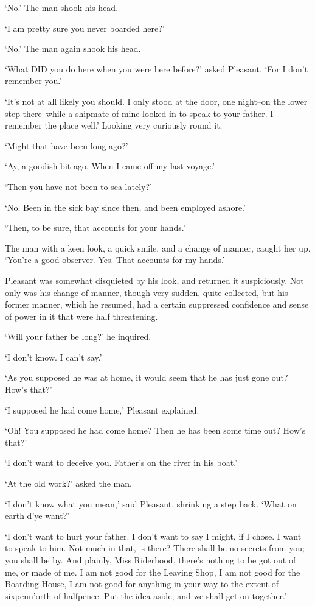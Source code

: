 ‘No.’ The man shook his head.

‘I am pretty sure you never boarded here?’

‘No.’ The man again shook his head.

‘What DID you do here when you were here before?’ asked Pleasant. ‘For I
don’t remember you.’

‘It’s not at all likely you should. I only stood at the door, one
night--on the lower step there--while a shipmate of mine looked in to
speak to your father. I remember the place well.’ Looking very curiously
round it.

‘Might that have been long ago?’

‘Ay, a goodish bit ago. When I came off my last voyage.’

‘Then you have not been to sea lately?’

‘No. Been in the sick bay since then, and been employed ashore.’

‘Then, to be sure, that accounts for your hands.’

The man with a keen look, a quick smile, and a change of manner, caught
her up. ‘You’re a good observer. Yes. That accounts for my hands.’

Pleasant was somewhat disquieted by his look, and returned it
suspiciously. Not only was his change of manner, though very sudden,
quite collected, but his former manner, which he resumed, had a
certain suppressed confidence and sense of power in it that were half
threatening.

‘Will your father be long?’ he inquired.

‘I don’t know. I can’t say.’

‘As you supposed he was at home, it would seem that he has just gone
out? How’s that?’

‘I supposed he had come home,’ Pleasant explained.

‘Oh! You supposed he had come home? Then he has been some time out?
How’s that?’

‘I don’t want to deceive you. Father’s on the river in his boat.’

‘At the old work?’ asked the man.

‘I don’t know what you mean,’ said Pleasant, shrinking a step back.
‘What on earth d’ye want?’

‘I don’t want to hurt your father. I don’t want to say I might, if I
chose. I want to speak to him. Not much in that, is there? There shall
be no secrets from you; you shall be by. And plainly, Miss Riderhood,
there’s nothing to be got out of me, or made of me. I am not good for
the Leaving Shop, I am not good for the Boarding-House, I am not good
for anything in your way to the extent of sixpenn’orth of halfpence. Put
the idea aside, and we shall get on together.’


